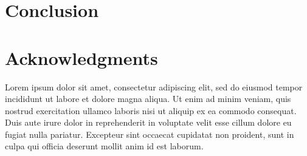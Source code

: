 \documentclass{sigchi}
\begin{document}
\section{Conclusion}


\section{Acknowledgments}
Lorem ipsum dolor sit amet, consectetur adipiscing elit, sed do eiusmod tempor incididunt ut labore et dolore magna aliqua. Ut enim ad minim veniam, quis nostrud exercitation ullamco laboris nisi ut aliquip ex ea commodo consequat. Duis aute irure dolor in reprehenderit in voluptate velit esse cillum dolore eu fugiat nulla pariatur. Excepteur sint occaecat cupidatat non proident, sunt in culpa qui officia deserunt mollit anim id est laborum.

%
%
%
%
%
\balance{}



\end{document}
